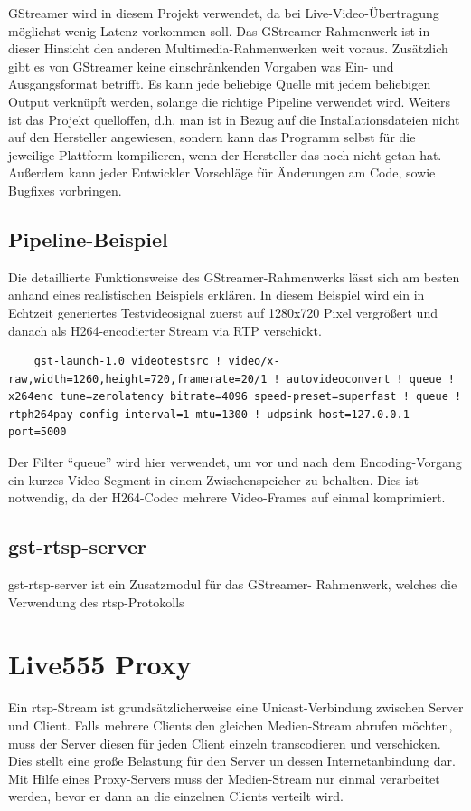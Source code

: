 GStreamer wird in diesem Projekt verwendet, da bei Live-Video-Übertragung möglichst wenig Latenz vorkommen soll.
Das GStreamer-Rahmenwerk ist in dieser Hinsicht den anderen Multimedia-Rahmenwerken weit voraus.
Zusätzlich gibt es von GStreamer keine einschränkenden Vorgaben was Ein- und Ausgangsformat betrifft.
Es kann jede beliebige Quelle mit jedem beliebigen Output verknüpft werden, solange die richtige Pipeline verwendet wird.
Weiters ist das Projekt quelloffen, d.h. man ist in Bezug auf die Installationsdateien nicht auf den Hersteller angewiesen, sondern kann das Programm selbst für die jeweilige Plattform kompilieren, wenn der Hersteller das noch nicht getan hat.
Außerdem kann jeder Entwickler Vorschläge für Änderungen am Code, sowie Bugfixes vorbringen.
\subsection{Pipeline-Beispiel}
Die detaillierte Funktionsweise des GStreamer-Rahmenwerks lässt sich am besten anhand eines realistischen Beispiels erklären.
In diesem Beispiel wird ein in Echtzeit generiertes Testvideosignal zuerst auf 1280x720 Pixel vergrößert und danach als H264-encodierter Stream via RTP verschickt.
\begin{lstlisting}
    gst-launch-1.0 videotestsrc ! video/x-raw,width=1260,height=720,framerate=20/1 ! autovideoconvert ! queue ! x264enc tune=zerolatency bitrate=4096 speed-preset=superfast ! queue ! rtph264pay config-interval=1 mtu=1300 ! udpsink host=127.0.0.1 port=5000
\end{lstlisting}
Der Filter \enquote{queue} wird hier verwendet, um vor und nach dem Encoding-Vorgang ein kurzes Video-Segment in einem Zwischenspeicher zu behalten. Dies ist notwendig, da der H264-Codec mehrere Video-Frames auf einmal komprimiert.

\subsection{gst-rtsp-server}
gst-rtsp-server ist ein Zusatzmodul für das GStreamer- Rahmenwerk, welches die Verwendung des \acs{rtsp}-Protokolls 

\section{Live555 Proxy}
Ein \acs{rtsp}-Stream ist grundsätzlicherweise eine Unicast-Verbindung zwischen Server und Client.
Falls mehrere Clients den gleichen Medien-Stream abrufen möchten, muss der Server diesen für jeden Client einzeln transcodieren und verschicken.
Dies stellt eine große Belastung für den Server un dessen Internetanbindung dar.
Mit Hilfe eines Proxy-Servers muss der Medien-Stream nur einmal verarbeitet werden, bevor er dann an die einzelnen Clients verteilt wird.\par

